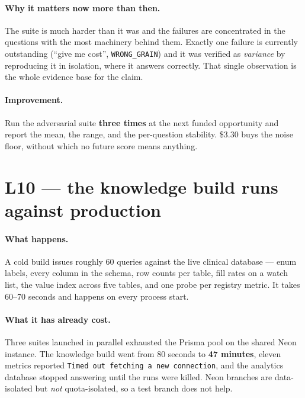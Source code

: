 \documentclass[11pt,a4paper]{report}
\newcommand{\code}[1]{\texttt{\small #1}}
\begin{document}
\paragraph{Why it matters now more than then.} The suite is much harder than it was and the failures
are concentrated in the questions with the most machinery behind them. Exactly one failure is
currently outstanding (``give me cost'', \code{WRONG\_GRAIN}) and it was verified as \emph{variance}
by reproducing it in isolation, where it answers correctly. That single observation is the whole
evidence base for the claim.

\paragraph{Improvement.} Run the adversarial suite \textbf{three times} at the next funded
opportunity and report the mean, the range, and the per-question stability. \$3.30 buys the noise
floor, without which no future score means anything.

\section{L10 --- the knowledge build runs against production}

\paragraph{What happens.} A cold build issues roughly 60 queries against the live clinical database
--- enum labels, every column in the schema, row counts per table, fill rates on a watch list, the
value index across five tables, and one probe per registry metric. It takes 60--70 seconds and
happens on every process start.

\paragraph{What it has already cost.} Three suites launched in parallel exhausted the Prisma pool on
the shared Neon instance. The knowledge build went from 80 seconds to \textbf{47 minutes}, eleven
metrics reported \code{Timed out fetching a new connection}, and the analytics database stopped
answering until the runs were killed. Neon branches are data-isolated but \emph{not}
quota-isolated, so a test branch does not help.
\end{document}
